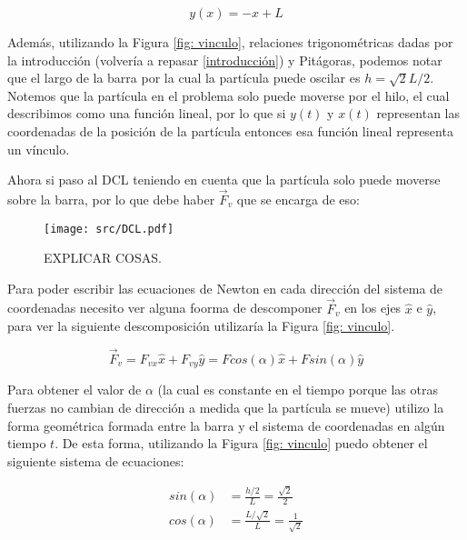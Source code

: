 \documentclass{article}
\begin{document}
\begin{multicols}{2}
\begin{equation}
    y(x) = -x + L
    \label{eq: ec_vinculo}
\end{equation}

Además, utilizando la Figura \ref{fig: vinculo}, relaciones trigonométricas dadas por la introducción (volvería a repasar \ref{introducción}) y Pitágoras, podemos notar que el largo de la barra por la cual la partícula puede oscilar es $h = \sqrt{2}L/2$.
Notemos que la partícula en el problema solo puede moverse por el hilo, el cual describimos como una función lineal, por lo que si $y(t)$ y $x(t)$ representan las coordenadas de la posición de la partícula entonces esa función lineal representa un vínculo.

Ahora si paso al DCL teniendo en cuenta que la partícula solo puede moverse sobre la barra, por lo que debe haber $\vec{F}_{v}$ que se encarga de eso:

\begin{figure}[H]
    \centering
    \texttt{[image: src/DCL.pdf]}
    \caption{
        EXPLICAR COSAS.
    }
    \label{fig: DCL}
\end{figure}

Para poder escribir las ecuaciones de Newton en cada dirección del sistema de coordenadas necesito ver alguna foorma de descomponer $\vec{F}_v$ en los ejes $\hat{x}$ e $\hat{y}$, para ver la siguiente descomposición utilizaría la Figura \ref{fig: vinculo}.

\begin{equation}
    \vec{F}_v = F_{vx} \hat{x} + F_{vy} \hat{y} = Fcos(\alpha) \hat{x} + Fsin(\alpha) \hat{y}
\end{equation}

Para obtener el valor de $\alpha$ (la cual es constante en el tiempo porque las otras fuerzas no cambian de dirección a medida que la partícula se mueve) utilizo la forma geométrica formada entre la barra y el sistema de coordenadas en algún tiempo $t$. De esta forma, utilizando la Figura \ref{fig: vinculo} puedo obtener el siguiente sistema de ecuaciones:

\begin{equation}
\begin{split}
    sin(\alpha) &= \frac{h/2}{L} = \frac{\sqrt{2}}{2} \\
    cos(\alpha) &= \frac{L/\sqrt{2}}{L} = \frac{1}{\sqrt{2}}
    \label{eq: sist_alpha}
\end{split}
\end{equation}


\end{multicols}
\end{document}
